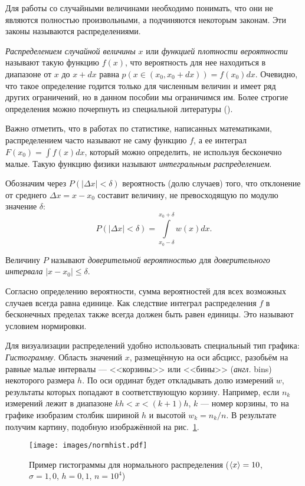 Для работы со случайными величинами необходимо понимать, что они не являются полностью произвольными, а подчиняются некоторым законам. Эти законы называются распределениями.

\emph{Распределением случайной величины} $x$ или \emph{функцией плотности вероятности} называют такую функцию $f(x)$, что вероятность для нее находиться в диапазоне от $x$ до $x+dx$ равна $p(x \in (x_0, x_0+dx)) = f(x_0) dx$. Очевидно, что такое определение годится только для численным величин и имеет ряд других ограничений, но в данном пособии мы ограничимся им. Более строгие определения можно почерпнуть из специальной литературы ().

Важно отметить, что в работах по статистике, написанных математиками, распределением часто называют не саму функцию $f$, а ее интеграл $F(x_0) = \int{f(x)dx}$, который можно определить, не используя бесконечно малые. Такую функцию физики называют \emph{интегральным распределением}.

Обозначим через $P\!\left(\left|\Delta x\right|<\delta\right)$ вероятность
(долю случаев) того, что отклонение от среднего $\Delta x=x-x_{0}$
составит величину, не превосходящую по модулю значение $\delta$:
\begin{equation*}
P\left(\left|\Delta x\right|<\delta\right)=\int\limits _{x_{0}-\delta}^{x_{0}+\delta}w\!\left(x\right)dx.
\end{equation*}

Величину $P$ называют \emph{доверительной вероятностью} для \emph{доверительного интервала} $\left|x-x_{0}\right|\le\delta$. 

Согласно определению вероятности, сумма вероятностей для всех возможных случаев всегда равна единице. Как следствие интеграл распределения $f$ в бесконечных пределах также всегда должен быть равен единицы. Это называют условием нормировки.

Для визуализации распределений удобно использовать специальный тип графика: \emph{Гистограмму}.
Область значений $x$, размещённую на оси абсцисс, разобьём на равные малые интервалы --- <<корзины>>
или <<бины>> (\emph{англ.} bins) некоторого
размера $h$. По оси ординат будет откладывать долю измерений $w$,
результаты которых попадают в соответствующую корзину. Например, если
$n_{k}$ измерений лежит в диапазоне $kh<x<(k+1)h$, $k$ ---
номер корзины, то на графике изобразим столбик шириной $h$ и высотой
$w_{k}=n_{k}/n$. В результате получим картину, подобную изображённой
на рис.~\ref{fig:normhist}. 

\begin{figure}
    \centering
    \texttt{[image: images/normhist.pdf]}
    \label{fig:normhist}
    \caption{Пример гистограммы для нормального распределения ($\left<x\right>=10$, $\sigma=1{,}0$, $h=0{,}1$, $n=10^{4}$)}
\end{figure}

